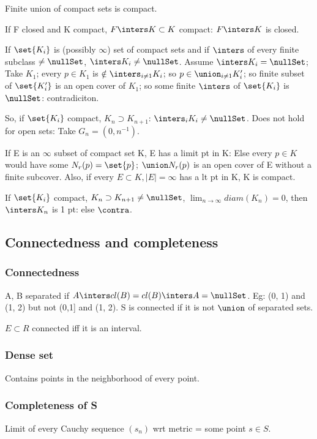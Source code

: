 \documentclass[oneside, article]{memoir}
\begin{document}
Finite union of compact sets is compact.

If F closed and K compact, $F \inters K \subset K$ compact: $F \inters K$ is closed.

If $\set{K_{i}}$ is (possibly $\infty$) set of compact sets and if $\inters$ of every finite subclass $\neq \nullSet$, $\inters K_{i} \neq \nullSet$. Assume $\inters K_{i}=\nullSet$; Take $K_{1}$; every $p \in K_{1}$ is $\notin \inters_{i \neq 1} K_{i}$; so $p \in \union_{i \neq 1} K_{i}'$; so finite subset of $\set{K_{i}'}$ is an open cover of $K_{1}$; so some finite $\inters$ of $\set{K_{i}}$ is $\nullSet$: contradiciton.

So, if $\set{K_{i}}$ compact, $K_{n} \supset K_{n+1}$: $\inters_{i} K_{i} \neq \nullSet$. Does not hold for open sets: Take $G_{n} = (0, n^{-1})$.

If E is an $\infty$ subset of compact set K, E has a limit pt in K: Else every $p \in K$ would have some $N_{r}(p) = \set{p}$; $\union N_{r}(p)$ is an open cover of E without a finite subcover. Also, if every $E \subset K, |E| = \infty $ has a lt pt in K, K is compact. \why

If $\set{K_{i}}$ compact, $K_{n} \supset K_{n+1} \neq \nullSet$, $\lim_{n \to \infty} diam(K_{n}) = 0$, then $\inters K_{n}$ is 1 pt: else $\contra$.

\subsection{Connectedness and completeness}
\subsubsection{Connectedness}
A, B separated if $A \inters cl(B) = cl(B) \inters A = \nullSet$. Eg: (0, 1) and (1, 2) but not (0,1] and (1, 2). S is connected if it is not $\union$ of separated sets.

$E \subset R$ connected iff it is an interval.

\subsubsection{Dense set}
Contains points in the neighborhood of every point.

\subsubsection{Completeness of S}
Limit of every Cauchy sequence $(s_{n})$ wrt metric = some point $s \in S$.
\end{document}
